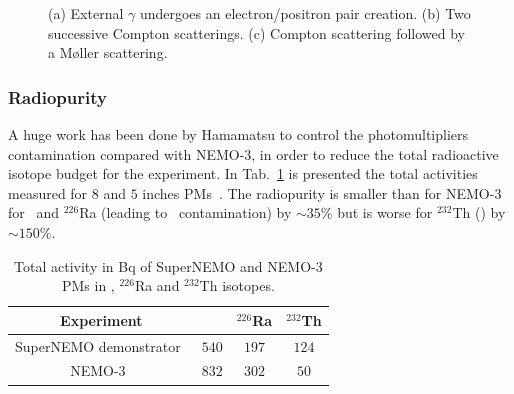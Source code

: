 \begin{figure}[!h]
\begin{subfigure}[t]{0.32\textwidth}
  \captionsetup{justification=justified}
  \caption{
    \label{subfig:ext_cont_moller}}%
\end{subfigure}
\caption{(a) External $\gamma$ undergoes an electron/positron pair creation.
    (b) Two successive Compton scatterings.
  (c) Compton scattering followed by a M\o{}ller scattering.
  \label{fig:external_contamination}}
\end{figure}

\subsubsection*{Radiopurity}

A huge work has been done by Hamamatsu to control the photomultipliers contamination compared with NEMO-$3$, in order to reduce the total radioactive isotope budget for the experiment.
In Tab.~\ref{tab:meas_ext_cont} is presented the total activities measured for $8$ and $5$ inches PMs~\cite{docdb:perrot2017}.
The radiopurity is smaller than for NEMO-$3$ for \K\ and $^{226}$Ra (leading to \Bi\ contamination) by $\sim35$\% but is worse for $^{232}$Th (\Tl) by $\sim150$\%.
\begin{table}[h!]
  \centering
  \begin{tabular}{|c|c|c|c|}
    \hline
    Experiment & \K & $^{226}$Ra & $^{232}$Th \\
    \hline\hline
    SuperNEMO demonstrator~\cite{docdb:perrot2017} & $540$ & $197$ & $124$ \\
    NEMO-$3$~\cite{art:NEMO3_2005} & $832$ & $302$ & $50$ \\
    \hline
  \end{tabular}
  \caption{Total activity in Bq of SuperNEMO and NEMO-$3$ PMs in \K, $^{226}$Ra and $^{232}$Th isotopes.
    \label{tab:meas_ext_cont}}
\end{table}


